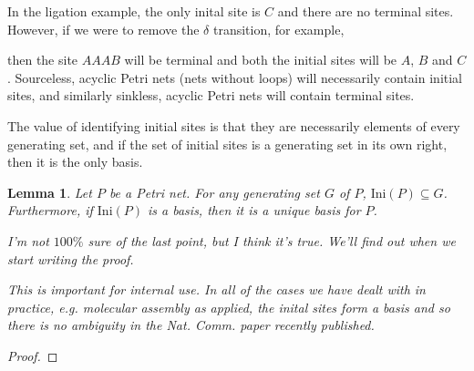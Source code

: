 \documentclass[aps,prd,onecolumn,nofootinbib,letterpaper,preprintnumbers,superscriptaddress,eqsecnum]{revtex4}
\newtheorem{lemma}{Lemma}
\theoremstyle{definition}
\newcommand{\Ini}[1]{\textrm{Ini}(#1)}
\newcommand{\red}[1]{{\color{red}#1}}
\newcommand{\green}[1]{{\color{ForestGreen}#1}}
\newcommand{\TODO}[1]{\noindent\red{\textbf{TODO:}~#1}}
\begin{document}
In the ligation example, the only inital site is $C$ and there are no terminal sites.
However, if we were to remove the $\delta$ transition, for example,
\begin{center}
\end{center}
then the site $AAAB$ will be terminal and both the initial sites will be $A$, $B$ and $C$.
Sourceless, acyclic Petri nets (nets without loops) will necessarily contain initial sites, and similarly sinkless, acyclic Petri nets will contain terminal sites.

The value of identifying initial sites is that they are necessarily elements of every generating set, and if the set of initial sites is a generating set in its own right, then it is the only basis.
\begin{lemma}\label{lem:initial-are-basic}
    Let $P$ be a Petri net.
    For any generating set $G$ of $P$, $\Ini{P} \subseteq G$.
    Furthermore, if $\Ini{P}$ is a basis, then it is a unique basis for $P$.

    \red{I'm not $100\%$ sure of the last point, but I think it's true. We'll find out when we start writing the proof.}

    \green{This is important for internal use. In all of the cases we have dealt with in practice, e.g. molecular assembly as applied, the inital sites form a basis and so there is no ambiguity in the Nat. Comm. paper recently published.}
\end{lemma}
\begin{proof}
    \TODO{Complete}
\end{proof}
\end{document}
